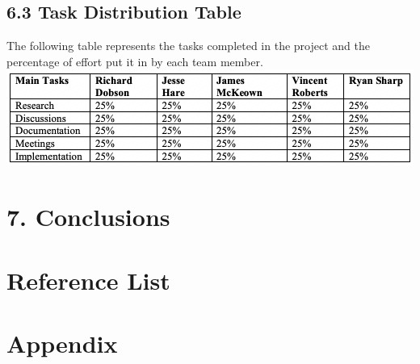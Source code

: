 \documentclass[11pt]{article}
\begin{document}
\subsection{6.3 Task Distribution Table}
The following table represents the tasks completed in the project and the percentage of effort put it in by each team member. \\

\includegraphics[scale=0.71]{task_distro.png} \\

\newpage



\section{7. Conclusions}


\newpage


\section{Reference List}


\newpage


\section{Appendix}
\end{document}

